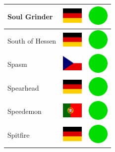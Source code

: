 \documentclass[12pt, a4paper, twoside]{report}
\begin{document}
\begin{center}
\begin{longtable}{|p{5cm}|p{2cm}|p{2cm}|}
 Soul Grinder                                               & \includegraphics[width=1cm]{../img/flags/de} &   \includegraphics[width=1cm]{../likes/y} \\ \hline
 South of Hessen                                            & \includegraphics[width=1cm]{../img/flags/de} &   \includegraphics[width=1cm]{../likes/y} \\ \hline
 Spasm                                                      & \includegraphics[width=1cm]{../img/flags/cz} &   \includegraphics[width=1cm]{../likes/y} \\ \hline
 Spearhead                                                  & \includegraphics[width=1cm]{../img/flags/de} &   \includegraphics[width=1cm]{../likes/y} \\ \hline
 Speedemon                                                  & \includegraphics[width=1cm]{../img/flags/pt} &   \includegraphics[width=1cm]{../likes/y} \\ \hline
 Spitfire                                                   & \includegraphics[width=1cm]{../img/flags/de} &   \includegraphics[width=1cm]{../likes/y} \\ \hline

\end{longtable}
\end{center}
\end{document}
